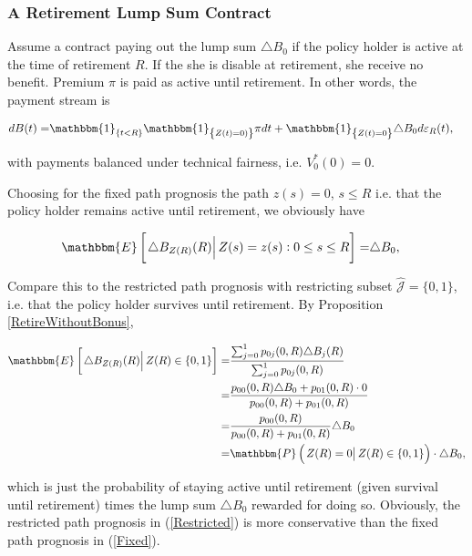 \documentclass{article}
\newcommand{\1}[1]{\mathbbm{1}_{\left\lbrace #1 \right\rbrace}}
\newcommand{\econd}[2][def]{\mathbbm{E} \left[ \left. #1 \right| #2 \right]}
\newcommand{\pcond}[2][def]{\mathbbm{P} \left( \left. #1 \right| #2 \right)}
\theoremstyle{break}
\theoremstyle{remark}
\numberwithin{equation}{section}
\begin{document}
\subsubsection{A Retirement Lump Sum Contract}

Assume a contract paying out the lump sum $\triangle B_0$ if the policy holder is active at the time of retirement $R$. If the she is disable at retirement, she receive no benefit. Premium $\pi$ is paid as active until retirement. In other words, the payment stream is

\begin{align*}
	dB(t) =& \1{t<R} \1{Z(t)=0)} \pi dt + \1{Z(t)=0} \triangle B_0 d \varepsilon_R(t),
\end{align*}

with payments balanced under technical fairness, i.e. $V_0^*(0)=0$.

Choosing for the fixed path prognosis the path $z(s) = 0$, $s \leq R$ i.e. that the policy holder remains active until retirement, we obviously have

\begin{align} \label{Fixed}
	\econd[\triangle B_{Z(R)}(R)]{Z(s) = z(s) : 0 \leq s \leq R} =& \triangle B_0,
\end{align}

Compare this to the restricted path prognosis with restricting subset $\hat{\mathcal{J}} = \{ 0,1 \}$, i.e. that the policy holder survives until retirement. By Proposition \ref{RetireWithoutBonus},

\begin{align} \label{Restricted}
\begin{split}
		\econd[\triangle B_{Z(R)} (R)]{Z(R) \in \{ 0,1 \}} =& \frac{\sum_{j = 0}^1 p_{0j}(0,R) \triangle B_j(R)}{\sum_{j = 0}^1 p_{0j}(0,R)} \\
	=&\frac{p_{00}(0,R) \triangle B_0 + p_{01}(0,R) \cdot 0}{p_{00}(0,R) + p_{01}(0,R)} \\
	=& \frac{p_{00}(0,R)}{p_{00}(0,R) + p_{01}(0,R)} \triangle B_0 \\
	=& \pcond[Z(R) = 0]{Z(R) \in \{ 0,1 \}} \cdot \triangle B_0,
\end{split}
\end{align}

which is just the probability of staying active until retirement (given survival until retirement) times the lump sum $\triangle B_0$ rewarded for doing so. Obviously, the restricted path prognosis in (\ref{Restricted}) is more conservative than the fixed path prognosis in (\ref{Fixed}).
\end{document}
